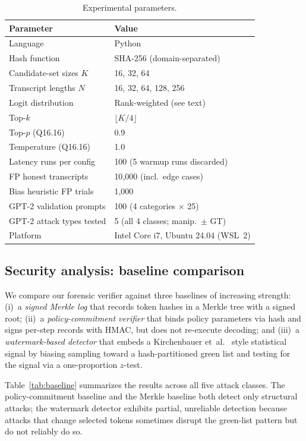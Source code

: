 \documentclass[conference]{IEEEtran}
\begin{document}
\begin{table}[t]
\caption{Experimental parameters.}\label{tab:params}
\centering
\begin{tabular}{@{}ll@{}}
\toprule
Parameter & Value \\
\midrule
Language              & Python \\
Hash function         & SHA-256 (domain-separated) \\
Candidate-set sizes $K$  & 16, 32, 64 \\
Transcript lengths $N$   & 16, 32, 64, 128, 256 \\
Logit distribution    & Rank-weighted (see text) \\
Top-$k$               & $\lfloor K/4 \rfloor$ \\
Top-$p$ (Q16.16)      & 0.9 \\
Temperature (Q16.16)  & 1.0 \\
Latency runs per config & 100 (5 warmup runs discarded) \\
FP honest transcripts & 10{,}000 (incl.\ edge cases) \\
Bias heuristic FP trials & 1{,}000 \\
GPT-2 validation prompts & 100 (4 categories $\times$ 25) \\
GPT-2 attack types tested & 5 (all 4 classes; manip.\ $\pm$ GT) \\
Platform              & Intel Core i7, Ubuntu 24.04 (WSL~2) \\
\bottomrule
\end{tabular}
\end{table}

\subsection{Security analysis: baseline comparison}

We compare our forensic verifier against three baselines of increasing strength: (i)~a \emph{signed Merkle log} that records token hashes in a Merkle tree with a signed root; (ii)~a \emph{policy-commitment verifier} that binds policy parameters via hash and signs per-step records with HMAC, but does not re-execute decoding; and (iii)~a \emph{watermark-based detector} that embeds a Kirchenbauer et~al.~\cite{Kirchenbauer2023Watermark} style statistical signal by biasing sampling toward a hash-partitioned green list and testing for the signal via a one-proportion $z$-test.

Table~\ref{tab:baseline} summarizes the results across all five attack classes. The policy-commitment baseline and the Merkle baseline both detect only structural attacks; the watermark detector exhibits partial, unreliable detection because attacks that change selected tokens sometimes disrupt the green-list pattern but do not reliably do so.
\end{document}
